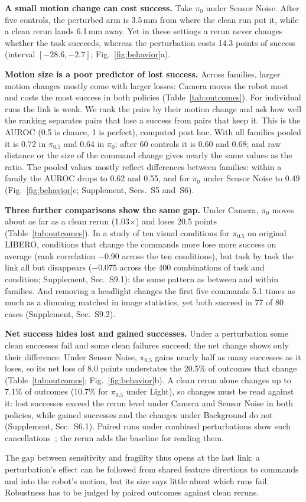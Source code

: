 \textbf{A small motion change can cost success.} Take $\pi_0$ under Sensor Noise. After five controls, the perturbed arm is 3.5\,mm from where the clean run put it, while a clean rerun lands 6.1\,mm away. Yet in these settings a rerun never changes whether the task succeeds, whereas the perturbation costs 14.3 points of success (interval $[-28.6,-2.7]$; Fig.~\ref{fig:behavior}a).

\textbf{Motion size is a poor predictor of lost success.} Across families, larger motion changes mostly come with larger losses: Camera moves the robot most and costs the most success in both policies (Table~\ref{tab:outcomes}). For individual runs the link is weak. We rank the pairs by their motion change and ask how well the ranking separates pairs that lose a success from pairs that keep it. This is the AUROC (0.5 is chance, 1 is perfect), computed post hoc. With all families pooled it is 0.72 in $\pi_{0.5}$ and 0.64 in $\pi_0$; after 60 controls it is 0.60 and 0.68; and raw distance or the size of the command change gives nearly the same values as the ratio. The pooled values mostly reflect differences between families: within a family the AUROC drops to 0.62 and 0.55, and for $\pi_0$ under Sensor Noise to 0.49 (Fig.~\ref{fig:behavior}c; Supplement, Secs.~S5 and~S6).

\textbf{Three further comparisons show the same gap.} Under Camera, $\pi_0$ moves about as far as a clean rerun (1.03$\times$) and loses 20.5 points (Table~\ref{tab:outcomes}). In a study of ten visual conditions for $\pi_{0.5}$ on original LIBERO, conditions that change the commands more lose more success on average (rank correlation $-0.90$ across the ten conditions), but task by task the link all but disappears ($-0.075$ across the 400 combinations of task and condition; Supplement, Sec.~S9.1): the same pattern as between and within families. And removing a headlight changes the first five commands 5.1 times as much as a dimming matched in image statistics, yet both succeed in 77 of 80 cases (Supplement, Sec.~S9.2).

\textbf{Net success hides lost and gained successes.} Under a perturbation some clean successes fail and some clean failures succeed; the net change shows only their difference. Under Sensor Noise, $\pi_{0.5}$ gains nearly half as many successes as it loses, so its net loss of 8.0 points understates the 20.5\% of outcomes that change (Table~\ref{tab:outcomes}; Fig.~\ref{fig:behavior}b). A clean rerun alone changes up to 7.1\% of outcomes (10.7\% for $\pi_{0.5}$ under Light), so changes must be read against it: lost successes exceed the rerun level under Camera and Sensor Noise in both policies, while gained successes and the changes under Background do not (Supplement, Sec.~S6.1). Paired runs under combined perturbations show such cancellations~\cite{sawada2026paired}; the rerun adds the baseline for reading them.

The gap between sensitivity and fragility thus opens at the last link: a perturbation's effect can be followed from shared feature directions to commands and into the robot's motion, but its size says little about which runs fail. Robustness has to be judged by paired outcomes against clean reruns.
